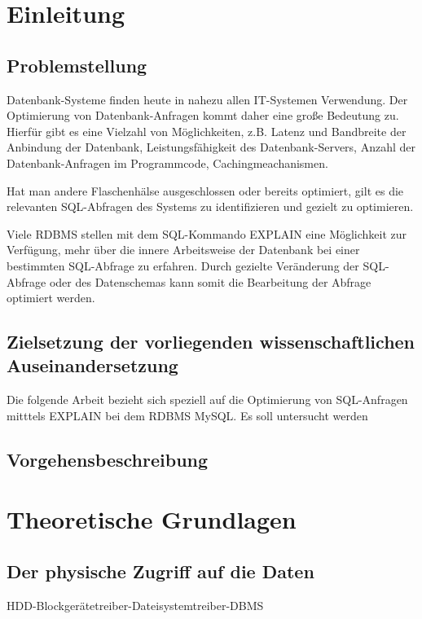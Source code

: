 
\section{Einleitung}
\subsection{Problemstellung}
Datenbank-Systeme finden heute in nahezu allen IT-Systemen Verwendung.
Der Optimierung von Datenbank-Anfragen kommt daher eine große Bedeutung zu.
Hierfür gibt es eine Vielzahl von Möglichkeiten, z.B. Latenz und Bandbreite der Anbindung der Datenbank, Leistungsfähigkeit des Datenbank-Servers, Anzahl der Datenbank-Anfragen im Programmcode, Cachingmeachanismen.

Hat man andere Flaschenhälse ausgeschlossen oder bereits optimiert,  gilt es die relevanten SQL-Abfragen des Systems zu identifizieren und gezielt zu optimieren.

Viele RDBMS stellen mit dem SQL-Kommando EXPLAIN eine Möglichkeit zur Verfügung, mehr über die innere Arbeitsweise der Datenbank bei einer bestimmten SQL-Abfrage zu erfahren.
Durch gezielte Veränderung der SQL-Abfrage oder des Datenschemas kann somit die Bearbeitung der Abfrage optimiert werden.

\subsection{Zielsetzung der vorliegenden  wissenschaftlichen  Auseinandersetzung}
Die folgende Arbeit bezieht sich speziell auf die Optimierung von SQL-Anfragen mitttels EXPLAIN bei dem RDBMS MySQL.
Es soll untersucht werden

\subsection{Vorgehensbeschreibung}


\section{Theoretische Grundlagen}
\subsection{Der physische Zugriff auf die Daten}
 HDD-Blockgerätetreiber-Dateisystemtreiber-DBMS
 
